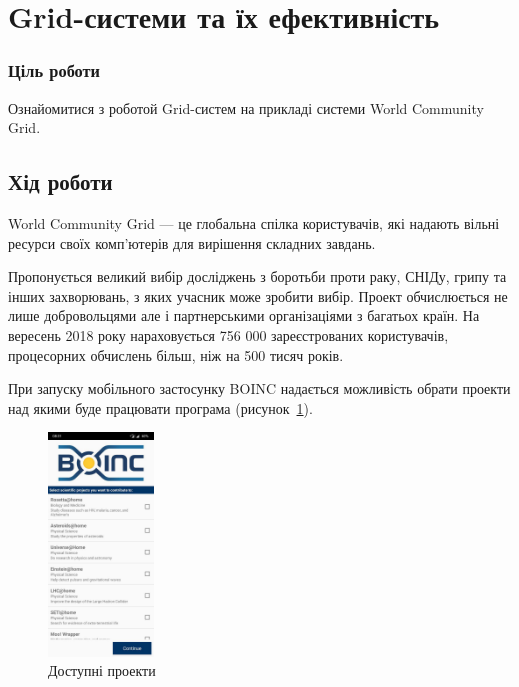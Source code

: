 


\newcommand{\labnumber}{1} %



\graphicspath{{figures/}}


\Ukrainian


\addtocounter{page}{1}

\section*{Grid-системи та їх ефективність}
\subsubsection*{Ціль роботи}
Ознайомитися з роботой Grid-систем на прикладі системи World Community Grid.

\subsection*{Хід роботи}
World Community Grid --- це глобальна спілка користувачів, які надають вільні ресурси своїх комп'ютерів для вирішення складних завдань.

Пропонується великий вибір досліджень з боротьби проти раку, СНІДу, грипу та інших захворювань, з яких учасник може зробити вибір. 
Проект обчислюється не лише добровольцями але і партнерськими організаціями з багатьох країн. 
На вересень 2018 року нараховується 756 000 зареєстрованих користувачів, процесорних обчислень більш, ніж на 500 тисяч років.

При запуску мобільного застосунку BOINC надається можливість обрати проекти над якими буде працювати програма (рисунок~\ref{fig:scr_projects}).

\begin{figure}[h]
    \centering
    \includegraphics[width=0.25\textwidth]{scr_projects}
    \caption{Доступні проекти}
    \label{fig:scr_projects}
\end{figure}

